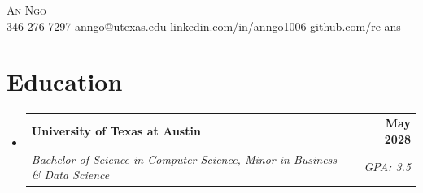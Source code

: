 \documentclass[letterpaper,10.5pt]{article}
\makeatletter
\newcommand{\resumeSubheading}[4]{
  \vspace{-2pt}\item
    \begin{tabular*}{1.0\textwidth}[t]{l@{\extracolsep{\fill}}r}
      \textbf{#1} & \textbf{\small #2} \\
      \textit{\small#3} & \textit{\small #4} \\
    \end{tabular*}\vspace{-7pt}
}
\newcommand{\resumeSubHeadingListStart}{\begin{itemize}[leftmargin=0.0in, label={}]}
\newcommand{\resumeSubHeadingListEnd}{\end{itemize}}
\makeatother
\begin{document}

\begin{center}
    {\Huge \scshape An Ngo} \\ \vspace{1pt}
    \small \raisebox{-0.1\height} 346-276-7297\quad\textbar\quad
    \href{mailto:anngo@utexas.edu}{\underline{anngo@utexas.edu}} \quad\textbar\quad
    \href{https://www.linkedin.com/in/anngo1006/}{\underline{linkedin.com/in/anngo1006}}\quad\textbar\quad
    \href{https://github.com/re-ans}{\underline{github.com/re-ans}} \\
    \vspace{-8pt}
\end{center}


\section{Education}
  \resumeSubHeadingListStart
    \resumeSubheading
      {University of Texas at Austin}{May 2028}
      {Bachelor of Science in Computer Science, Minor in Business \& Data Science}{GPA: 3.5}
  \resumeSubHeadingListEnd


\end{document}

